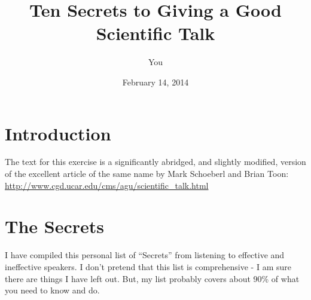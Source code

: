 \documentclass[12pt]{article}
\title{Ten Secrets to Giving a Good Scientific Talk}
\author{You}
\date{February 14, 2014}
\begin{document}
\maketitle

\section{Introduction}

The text for this exercise is a significantly abridged, and slightly modified, version of the excellent article of the same name by Mark Schoeberl and Brian Toon: \url{http://www.cgd.ucar.edu/cms/agu/scientific_talk.html}

\section{The Secrets}

I have compiled this personal list of ``Secrets'' from listening to effective and ineffective speakers. I don't pretend that this list is comprehensive - I am sure there are things I have left out. But, my list probably covers about 90\% of what you need to know and do.
\end{document}
